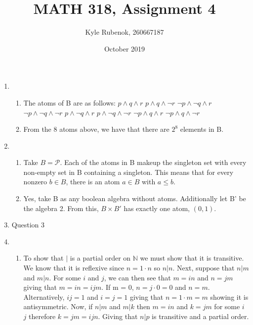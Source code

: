 \documentclass{article}
\title{MATH 318, Assignment 4}
\author{Kyle Rubenok, 260667187}
\date{October 2019}
\begin{document}
\maketitle

    \begin{enumerate}
        \item 
            \begin{enumerate}[label=\arabic*)] 
                \item The atoms of B are as follows: 
                    \newline 
                    $p \wedge q \wedge r$ \tab $p \wedge q \wedge \neg r$ \newline
                    $\neg p \wedge \neg q \wedge r$ \tab $\neg p \wedge \neg q \wedge \neg r$ \newline
                    $p \wedge \neg q \wedge r$ \tab $p \wedge \neg q \wedge \neg r$ \newline
                    $\neg p \wedge q \wedge r$ \tab $\neg p \wedge q \wedge \neg r$ \newline
                \item From the 8 atoms above, we have that there are $2^8$ elements in B. 
            \end{enumerate}
        \item
            \begin{enumerate}[label=\arabic*)]
                \item Take $B = \mathcal{P}$. Each of the atoms in B makeup the singleton set with every non-empty set in B containing a singleton. This means that for every nonzero $b \in B$, there is an atom $a \in B$ with $ a \leq b$. 
                \item Yes, take B as any boolean algebra without atoms. Additionally let B' be the algebra 2. From this, $B \times B'$ has exactly one atom, $(0,1)$.
            \end{enumerate}
        \item Question 3
        \item  
            \begin{enumerate}[label=\arabic*)]
                \item To show that $|$ is a partial order on $\mathds{N}$ we must show that it is transitive. We know that it is reflexive since $n=1 \cdot n$ so $n|n$. Next, suppose that $n|m$ and $m|n$. For some $i$ and $j$, we can then see that $m=in$ and $n=jm$ giving that $ m = in = ijm$. If m = 0, $n=j \cdot 0 = 0$ and $n=m$. Alternatively, $ij = 1$ and $i = j = 1$ giving that $n = 1 \cdot m = m$ showing it is antisymmetric. Now, if $n|m$ and $m | k$ then $m = in$ and $k = jm$ for some $i$ $j$ therefore $k = jm = ijn$. Giving that $n|p$ is transitive and a partial order. 

\end{enumerate}
\end{enumerate}
\end{document}
